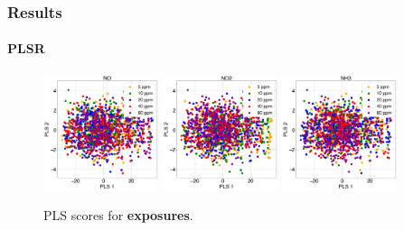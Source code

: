 \documentclass{beamer}
\begin{document}
\begin{frame}
	\frametitle{Results}
	\framesubtitle{PLSR}
		
		\begin{figure}
			\includegraphics[width=0.30\textwidth]{../../figures/plsNO.png}
			\hfill
			\includegraphics[width=0.30\textwidth]{../../figures/plsNO2.png}
			\hfill
			\includegraphics[width=0.30\textwidth]{../../figures/plsNH3.png}
			\caption{PLS scores for \textbf{exposures}.}
			\label{fig:pls}
		\end{figure}
		

\end{frame}
\end{document}

